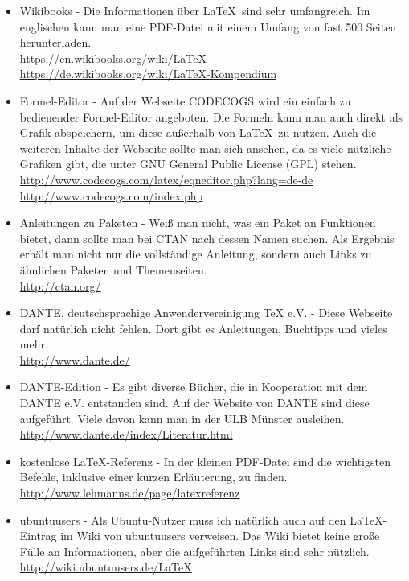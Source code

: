\begin{itemize}
    \item Wikibooks - Die Informationen über \LaTeX\ sind sehr umfangreich. Im englischen kann man eine PDF-Datei mit einem Umfang von fast 500 Seiten herunterladen.\\
    \url{https://en.wikibooks.org/wiki/LaTeX}\\
    \url{https://de.wikibooks.org/wiki/LaTeX-Kompendium}
    \item Formel-Editor - Auf der Webseite CODECOGS wird ein einfach zu bedienender Formel-Editor angeboten. Die Formeln kann man auch direkt als Grafik abspeichern, um diese außerhalb von \LaTeX\ zu nutzen. Auch die weiteren Inhalte der Webseite sollte man sich ansehen, da es viele nützliche Grafiken gibt,
    die unter GNU General Public License (GPL) stehen.\\
    \url{http://www.codecogs.com/latex/eqneditor.php?lang=de-de}\\
    \url{http://www.codecogs.com/index.php}
    \item Anleitungen zu Paketen - Weiß man nicht, was ein Paket an Funktionen bietet, dann sollte man bei CTAN nach dessen Namen suchen. Als Ergebnis erhält man nicht nur die vollständige Anleitung, sondern auch Links zu ähnlichen Paketen und Themenseiten.\\
    \url{http://ctan.org/}
    \item DANTE, deutschsprachige Anwendervereinigung TeX e.V. - Diese Webseite darf natürlich nicht fehlen. Dort gibt es Anleitungen, Buchtipps und vieles mehr.\\
    \url{http://www.dante.de/}
    \item DANTE-Edition - Es gibt diverse Bücher, die in Kooperation mit dem DANTE e.V. entstanden sind. Auf der Website von DANTE sind diese aufgeführt. Viele davon kann man in der ULB Münster ausleihen.\\
    \url{http://www.dante.de/index/Literatur.html}
    \item kostenlose \LaTeX-Referenz - In der kleinen PDF-Datei sind die wichtigsten Befehle, inklusive einer kurzen Erläuterung, zu finden.\\
    \url{http://www.lehmanns.de/page/latexreferenz}
    \item ubuntuusers - Als Ubuntu-Nutzer muss ich natürlich auch auf den \LaTeX-Eintrag im Wiki von ubuntuusers verweisen. Das Wiki bietet keine große Fülle an Informationen, aber die aufgeführten Links sind sehr nützlich.\\
    \url{http://wiki.ubuntuusers.de/LaTeX}
\end{itemize}

